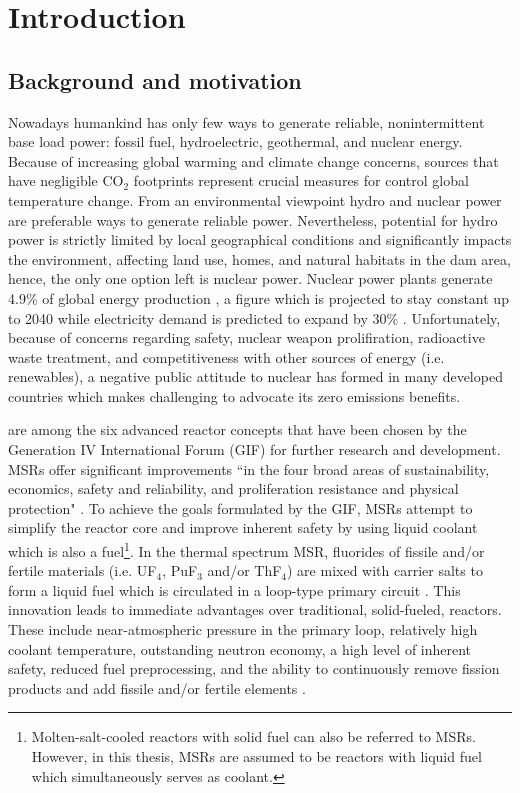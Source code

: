 \chapter[Introduction]{Introduction}

\section{Background and motivation}

Nowadays humankind has only few ways to generate reliable, nonintermittent base load power: fossil fuel, hydroelectric, geothermal, and nuclear energy. Because of increasing global warming and climate change concerns, sources that have negligible CO$_2$ footprints represent crucial measures for control global temperature change. From an environmental viewpoint hydro and nuclear power are preferable ways to generate reliable power. Nevertheless, potential for hydro power is strictly limited by local geographical conditions and significantly impacts the environment, affecting land use, homes, and natural habitats in the dam area, hence, the only one option left is nuclear power. Nuclear power plants generate 4.9\% of global energy production \cite{noauthor_key_2017}, a figure which is projected to stay constant up to 2040 while electricity demand is predicted to expand by 30\% \cite{noauthor_world_2017}. Unfortunately, because of concerns regarding safety, nuclear weapon prolifiration, radioactive waste treatment, and competitiveness with other sources of energy (i.e. renewables), a negative public attitude to nuclear has formed in many developed countries which makes challenging to advocate its zero emissions benefits.

 are among the six advanced reactor concepts that have been chosen by the Generation IV International Forum (GIF) for further research and development. \glspl{MSR} offer significant improvements ``in the four broad areas of sustainability, economics, safety and reliability, and proliferation resistance and physical protection" \cite{doe_technology_2002}. To achieve the goals formulated by the GIF, \glspl{MSR} attempt to simplify the reactor core and improve inherent safety by using liquid coolant which is also a fuel\footnote{Molten-salt-cooled reactors with solid fuel can also be referred to \glspl{MSR}. However, in this thesis, \glspl{MSR} are assumed to be reactors with liquid fuel which simultaneously serves as coolant.}. In the thermal spectrum \gls{MSR}, fluorides of fissile and/or fertile materials (i.e. UF$_4$, PuF$_3$ and/or ThF$_4$) are mixed with carrier salts to form a liquid fuel which is circulated in a loop-type primary circuit \cite{haubenreich_experience_1970}. This innovation leads to immediate advantages over traditional, solid-fueled, reactors. These include near-atmospheric pressure in the primary loop, relatively high coolant temperature, outstanding neutron economy, a high level of inherent safety, reduced fuel preprocessing, and the ability to continuously remove fission products and add fissile and/or fertile elements \cite{leblanc_molten_2010}. 


